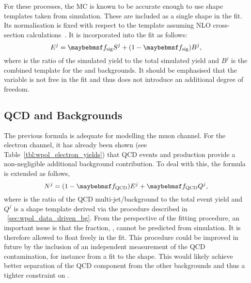 For these processes, the \ac{MC} is known to be accurate enough to use \LP shape
templates taken from simulation. These are included as a single shape in the
fit. Its normalisation is fixed with respect to the \Wjets template assuming
\ac{NLO} cross-section
calculations~\cite{ellis_wp3jet,berger_wp4jet,heavy_quark,top_quark,drellyan}. It
is incorporated into the fit as follows:
\begin{equation*}
E^j = \fsig S^j + (1-\fsig) B^j,
\end{equation*}
where \fsig is the ratio of the simulated \Wjets yield to the total
simulated yield and $B^j$ is the combined \LP template for the \Zjets and \ttbar
backgrounds. It should be emphasised that the variable \fsig is not
free in the fit and thus does not introduce an additional degree of freedom.

\subsection[\acs{QCD} and \texorpdfstring{\gammajets}{Photon+jets} Backgrounds]{\acs{QCD} and \gammajets Backgrounds}
The previous formula is adequate for modelling the muon channel. For the
electron channel, it has already been shown (see
Table~\ref{tbl:wpol_electron_yields}) that \ac{QCD} events and \gammajets
production provide a non-negligible additional background contribution. To deal
with this, the formula is extended as follows,
\begin{equation*}
N^j = (1 - \fQCD) E^j + \fQCD Q^j,
\end{equation*}
where \fQCD is the ratio of the QCD multi-jet/\gammajets background to the total
event yield and $Q^j$ is a shape template derived via the procedure described in
\sec~\ref{sec:wpol_data_driven_bg}. From the perspective of the fitting
procedure, an important issue is that the fraction, \fQCD, cannot be predicted
from simulation. It is therefore allowed to float freely in the fit. This
procedure could be improved in future by the inclusion of an independent
measurement of the \ac{QCD} contamination, for instance from a fit to the \MET
shape. This would likely achieve better separation of the \ac{QCD} component
from the other backgrounds and thus a tighter constraint on \fQCD.

